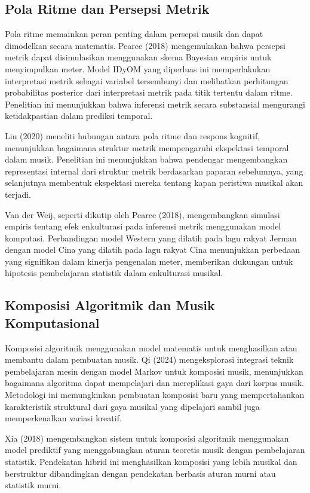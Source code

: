 \documentclass[a4paper,12pt]{article}
\begin{document}
\subsection*{Pola Ritme dan Persepsi Metrik}

Pola ritme memainkan peran penting dalam persepsi musik dan dapat dimodelkan secara matematis. Pearce (2018) mengemukakan bahwa persepsi metrik dapat disimulasikan menggunakan skema Bayesian empiris untuk menyimpulkan meter. Model IDyOM yang diperluas ini memperlakukan interpretasi metrik sebagai variabel tersembunyi dan melibatkan perhitungan probabilitas posterior dari interpretasi metrik pada titik tertentu dalam ritme. Penelitian ini menunjukkan bahwa inferensi metrik secara substansial mengurangi ketidakpastian dalam prediksi temporal.

Liu (2020) meneliti hubungan antara pola ritme dan respons kognitif, menunjukkan bagaimana struktur metrik mempengaruhi ekspektasi temporal dalam musik. Penelitian ini menunjukkan bahwa pendengar mengembangkan representasi internal dari struktur metrik berdasarkan paparan sebelumnya, yang selanjutnya membentuk ekspektasi mereka tentang kapan peristiwa musikal akan terjadi.

Van der Weij, seperti dikutip oleh Pearce (2018), mengembangkan simulasi empiris tentang efek enkulturasi pada inferensi metrik menggunakan model komputasi. Perbandingan model Western yang dilatih pada lagu rakyat Jerman dengan model Cina yang dilatih pada lagu rakyat Cina menunjukkan perbedaan yang signifikan dalam kinerja pengenalan meter, memberikan dukungan untuk hipotesis pembelajaran statistik dalam enkulturasi musikal.

\subsection*{Komposisi Algoritmik dan Musik Komputasional}

Komposisi algoritmik menggunakan model matematis untuk menghasilkan atau membantu dalam pembuatan musik. Qi (2024) mengeksplorasi integrasi teknik pembelajaran mesin dengan model Markov untuk komposisi musik, menunjukkan bagaimana algoritma dapat mempelajari dan mereplikasi gaya dari korpus musik. Metodologi ini memungkinkan pembuatan komposisi baru yang mempertahankan karakteristik struktural dari gaya musikal yang dipelajari sambil juga memperkenalkan variasi kreatif.

Xia (2018) mengembangkan sistem untuk komposisi algoritmik menggunakan model prediktif yang menggabungkan aturan teoretis musik dengan pembelajaran statistik. Pendekatan hibrid ini menghasilkan komposisi yang lebih musikal dan berstruktur dibandingkan dengan pendekatan berbasis aturan murni atau statistik murni.
\end{document}
